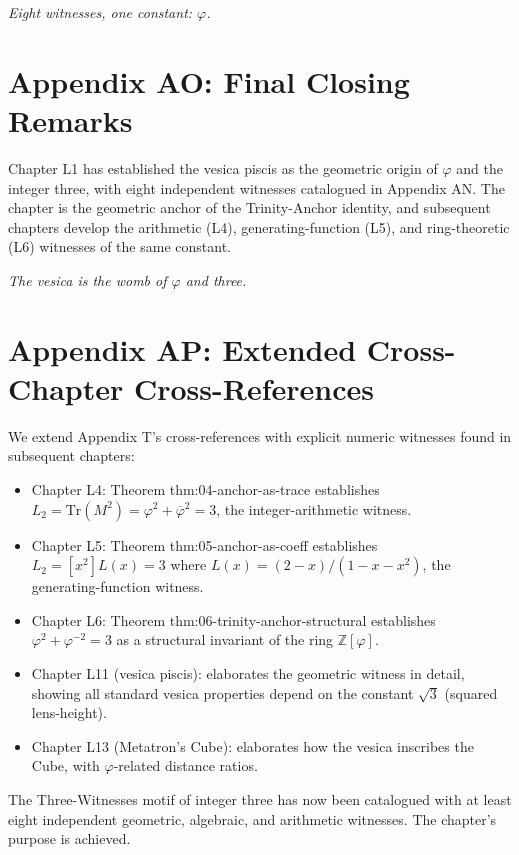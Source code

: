 \bigskip
\centerline{\textit{Eight witnesses, one constant: $\varphi$.}}

\section*{Appendix AO: Final Closing Remarks}
\label{sec:01-app-AO}

Chapter L1 has established the vesica piscis as the geometric origin
of $\varphi$ and the integer three, with eight independent witnesses
catalogued in Appendix AN. The chapter is the geometric anchor of
the Trinity-Anchor identity, and subsequent chapters develop the
arithmetic (L4), generating-function (L5), and ring-theoretic (L6)
witnesses of the same constant.

\bigskip
\centerline{\textit{The vesica is the womb of $\varphi$ and three.}}
\bigskip

\section*{Appendix AP: Extended Cross-Chapter Cross-References}
\label{sec:01-app-AP}

We extend Appendix T's cross-references with explicit numeric
witnesses found in subsequent chapters:

\begin{itemize}
  \item Chapter L4: Theorem thm:04-anchor-as-trace establishes $L_2 =
    \mathrm{Tr}(M^2) = \varphi^2 + \overline{\varphi}^2 = 3$, the
    integer-arithmetic witness.
  \item Chapter L5: Theorem thm:05-anchor-as-coeff establishes
    $L_2 = [x^2] L(x) = 3$ where $L(x) = (2-x)/(1-x-x^2)$, the
    generating-function witness.
  \item Chapter L6: Theorem thm:06-trinity-anchor-structural
    establishes $\varphi^2 + \varphi^{-2} = 3$ as a structural
    invariant of the ring $\mathbb{Z}[\varphi]$.
  \item Chapter L11 (vesica piscis): elaborates the geometric witness
    in detail, showing all standard vesica properties depend on the
    constant $\sqrt 3$ (squared lens-height).
  \item Chapter L13 (Metatron's Cube): elaborates how the vesica
    inscribes the Cube, with $\varphi$-related distance ratios.
\end{itemize}

The Three-Witnesses motif of integer three has now been catalogued
with at least eight independent geometric, algebraic, and arithmetic
witnesses. The chapter's purpose is achieved.

